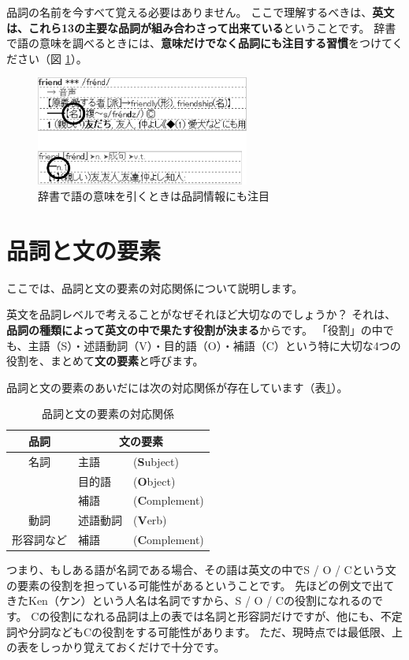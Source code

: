 \documentclass[12pt,titlepage]{jsarticle}
\begin{document}
 品詞の名前を今すべて覚える必要はありません。
 ここで理解するべきは、{\bf 英文は、これら13の主要な品詞が組み合わさって出来ている}ということです。
 辞書で語の意味を調べるときには、{\bf 意味だけでなく品詞にも注目する習慣}をつけてください（図 \ref{fig3}）。
  \begin{figure}[htbp]
   \begin{center}
    \includegraphics[width=7cm]{./figure/fig3.pdf}
    \caption{辞書で語の意味を引くときは品詞情報にも注目}
    \label{fig3}
   \end{center}
  \end{figure}


 \section{品詞と文の要素}
 ここでは、品詞と文の要素の対応関係について説明します。

 英文を品詞レベルで考えることがなぜそれほど大切なのでしょうか？
 それは、{\bf 品詞の種類によって英文の中で果たす役割が決まる}からです。
 「役割」の中でも、主語（S）・述語動詞（V）・目的語（O）・補語（C）という特に大切な4つの役割を、まとめて{\bf 文の要素}と呼びます。

 品詞と文の要素のあいだには次の対応関係が存在しています（表\ref{tab1}）。
 \begin{table}[htbp]
  \begin{center}
   \caption{品詞と文の要素の対応関係}
   \begin{tabular}{|c|ll|}
    \hline
    品詞 & \multicolumn{2}{|c|}{文の要素} \\ \hline \hline
    名詞 & 主語 & ({\bf S}ubject) \\ 
    & 目的語 & ({\bf O}bject) \\
    & 補語 & ({\bf C}omplement) \\ \hline
    動詞 & 述語動詞 & ({\bf V}erb) \\ \hline
    形容詞など & 補語 & ({\bf C}omplement) \\ \hline
   \end{tabular}
   \label{tab1}
  \end{center}
 \end{table}
 つまり、もしある語が名詞である場合、その語は英文の中でS / O / Cという文の要素の役割を担っている可能性があるということです。
 先ほどの例文で出てきたKen（ケン）という人名は名詞ですから、S / O / Cの役割になれるのです。
 Cの役割になれる品詞は上の表では名詞と形容詞だけですが、他にも、不定詞や分詞などもCの役割をする可能性があります。
 ただ、現時点では最低限、上の表をしっかり覚えておくだけで十分です。
\end{document}
